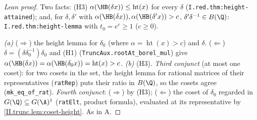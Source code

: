 \begin{proof}[Lean proof]
Two facts: (H3) $\alpha(\HB(\delta x))\le\operatorname{ht}(x)$ for every $\delta$ (\texttt{I.red.thm:height-attained}); and, for $\delta,\delta'$ with $\alpha(\HB(\delta x)),\alpha(\HB(\delta'x))>c$, $\delta'\delta^{-1}\in B(\Q)$: \texttt{I.red.thm:height-lemma} with $t_0=e^c\ge1$ ($c\ge0$).

\emph{(a)} ($\Rightarrow$) the height lemma for $\delta_0$ (where $\alpha=\operatorname{ht}(x)>c$) and $\delta$. ($\Leftarrow$) $\delta=(\delta\delta_0^{-1})\delta_0$ and (H1) (\texttt{TruncAux.rootAt\_borel\_mul}) give $\alpha(\HB(\delta x))=\alpha(\HB(\delta_0x))=\operatorname{ht}(x)>c$. \emph{(b)} (H3). \emph{Third conjunct} (at most one coset): for two cosets in the set, the height lemma for rational matrices of their representatives (\texttt{ratRep}) puts their ratio in $B(\Q)$, so the cosets agree (\texttt{mk\_eq\_of\_rat}). \emph{Fourth conjunct}: ($\Rightarrow$) by (H3); ($\Leftarrow$) the coset of $\delta_0$ regarded in $G(\Q)\subseteq G(\A)^1$ (\texttt{ratElt}, product formula), evaluated at its representative by \cref{II.trunc.lem:coset-height}. As in A.
\end{proof}

